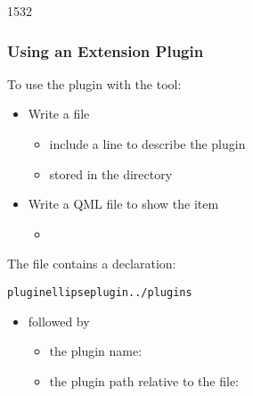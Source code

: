 \begin{slide}[fragile]{1532}\frametitle{Using an Extension Plugin}

To use the plugin with the  tool:

\begin{itemize}
\item Write a  file
  \begin{itemize}
  \item include a line to describe the plugin
  \item stored in the  directory
  \end{itemize}
\vspace*{0.5em}
\item Write a QML file to show the item
  \begin{itemize}
  \item {}
  \end{itemize}
\end{itemize}

\vspace*{1em}
The  file contains a declaration:\vspace*{-3mm}
\begin{alltt}
plugin ellipseplugin ../plugins
\end{alltt}

\begin{itemize}
\item \textbf{} followed by
  \begin{itemize}
  \item the plugin name: \textbf{}
  \item the plugin path relative to the  file: \textbf{}
  \end{itemize}
\end{itemize}

\end{slide}

